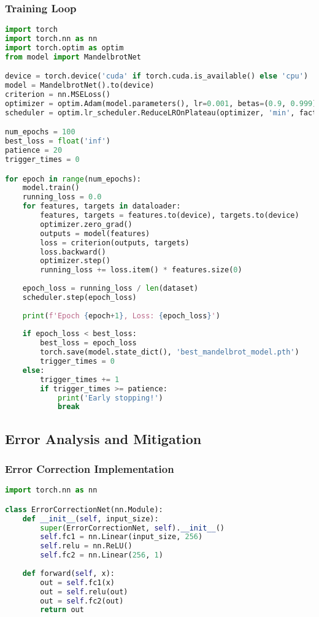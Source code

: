 \documentclass[journal]{IEEEaccess}
\begin{document}
\subsubsection{Training Loop}
\begin{lstlisting}[language=Python, caption=PyTorch Training Loop]
import torch
import torch.nn as nn
import torch.optim as optim
from model import MandelbrotNet

device = torch.device('cuda' if torch.cuda.is_available() else 'cpu')
model = MandelbrotNet().to(device)
criterion = nn.MSELoss()
optimizer = optim.Adam(model.parameters(), lr=0.001, betas=(0.9, 0.999))
scheduler = optim.lr_scheduler.ReduceLROnPlateau(optimizer, 'min', factor=0.1, patience=5)

num_epochs = 100
best_loss = float('inf')
patience = 20
trigger_times = 0

for epoch in range(num_epochs):
    model.train()
    running_loss = 0.0
    for features, targets in dataloader:
        features, targets = features.to(device), targets.to(device)
        optimizer.zero_grad()
        outputs = model(features)
        loss = criterion(outputs, targets)
        loss.backward()
        optimizer.step()
        running_loss += loss.item() * features.size(0)
    
    epoch_loss = running_loss / len(dataset)
    scheduler.step(epoch_loss)
    
    print(f'Epoch {epoch+1}, Loss: {epoch_loss}')
    
    if epoch_loss < best_loss:
        best_loss = epoch_loss
        torch.save(model.state_dict(), 'best_mandelbrot_model.pth')
        trigger_times = 0
    else:
        trigger_times += 1
        if trigger_times >= patience:
            print('Early stopping!')
            break
\end{lstlisting}

\subsection{Error Analysis and Mitigation}
\subsubsection{Error Correction Implementation}
\begin{lstlisting}[language=Python, caption=Error Correction Network]
import torch.nn as nn

class ErrorCorrectionNet(nn.Module):
    def __init__(self, input_size):
        super(ErrorCorrectionNet, self).__init__()
        self.fc1 = nn.Linear(input_size, 256)
        self.relu = nn.ReLU()
        self.fc2 = nn.Linear(256, 1)
    
    def forward(self, x):
        out = self.fc1(x)
        out = self.relu(out)
        out = self.fc2(out)
        return out
\end{lstlisting}
\end{document}
